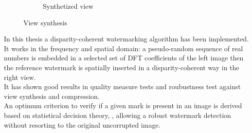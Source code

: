 \begin{figure}[h!]
\begin{subfigure}[]{0.4\textwidth}
\caption{\small{Synthetized view}}
\label{fig:vs3}
\end{subfigure}
\caption{\small{View synthesis}\label{fig:vs}}
\end{figure}



In this thesis a disparity-coherent watermarking algorithm has been implemented. It works in the frequency and spatial domain: a pseudo-random sequence of real numbers is embedded in a selected set of DFT coefficients of the left image then  the reference watermark is spatially inserted in a disparity-coherent way in the right view.\\
It has shown good results in quality measure tests and roubustness test against view synthesis and compression.\\
An optimum criterion to verify if a given mark is present in an image is derived based on statistical decision theory, \cite{STAT}, allowing a robust watermark detection without resorting to the original uncorrupted image.\\







